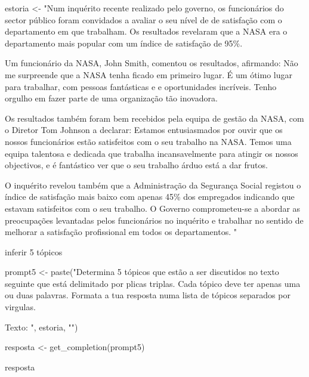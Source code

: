 \documentclass[
  letterpaper,
  paper=6in:9in,
  pagesize=pdftex,
  headinclude=on,
  footinclude=on,
  12pt]{scrbook}
\newenvironment{Shaded}{\begin{snugshade}}{\end{snugshade}}
\newcommand{\FunctionTok}[1]{\textcolor[rgb]{0.28,0.35,0.67}{#1}}
\newcommand{\NormalTok}[1]{\textcolor[rgb]{0.00,0.23,0.31}{#1}}
\newcommand{\OtherTok}[1]{\textcolor[rgb]{0.00,0.23,0.31}{#1}}
\newcommand{\StringTok}[1]{\textcolor[rgb]{0.13,0.47,0.30}{#1}}
\begin{document}
\begin{Shaded}
\begin{Highlighting}[]
\NormalTok{estoria }\OtherTok{\textless{}{-}} \StringTok{"Num inquérito recente realizado pelo governo, }
\StringTok{os funcionários do sector público foram convidados a avaliar o seu nível de }
\StringTok{de satisfação com o departamento em que trabalham. }
\StringTok{Os resultados revelaram que a NASA era o departamento mais popular }
\StringTok{com um índice de satisfação de 95\%.}

\StringTok{Um funcionário da NASA, John Smith, comentou os resultados, }
\StringTok{afirmando: \textquotesingle{}Não me surpreende que a NASA tenha ficado em primeiro lugar. }
\StringTok{É um ótimo lugar para trabalhar, com pessoas fantásticas e }
\StringTok{e oportunidades incríveis. Tenho orgulho em fazer parte de }
\StringTok{uma organização tão inovadora.\textquotesingle{}}

\StringTok{Os resultados também foram bem recebidos pela equipa de gestão da NASA, }
\StringTok{com o Diretor Tom Johnson a declarar: \textquotesingle{}Estamos entusiasmados por }
\StringTok{ouvir que os nossos funcionários estão satisfeitos com o seu trabalho na NASA. }
\StringTok{Temos uma equipa talentosa e dedicada que trabalha incansavelmente }
\StringTok{para atingir os nossos objectivos, e é fantástico ver que o seu }
\StringTok{trabalho árduo está a dar frutos\textquotesingle{}.}

\StringTok{O inquérito revelou também que a }
\StringTok{Administração da Segurança Social registou o índice de satisfação mais baixo }
\StringTok{com apenas 45\% dos empregados indicando que estavam }
\StringTok{satisfeitos com o seu trabalho. O Governo comprometeu{-}se a }
\StringTok{abordar as preocupações levantadas pelos funcionários no inquérito e }
\StringTok{trabalhar no sentido de melhorar a satisfação profissional em todos os departamentos.}
\StringTok{"}
\end{Highlighting}
\end{Shaded}

inferir 5 tópicos

\begin{Shaded}
\begin{Highlighting}[]
\NormalTok{prompt5 }\OtherTok{\textless{}{-}} \FunctionTok{paste}\NormalTok{(}\StringTok{"Determina 5 tópicos que estão a ser discutidos no texto seguinte }
\StringTok{que está delimitado por plicas triplas.}
\StringTok{Cada tópico deve ter apenas uma ou duas palavras.}
\StringTok{Formata a tua resposta numa lista de tópicos separados por virgulas.}

\StringTok{                 Texto: \textquotesingle{}\textquotesingle{}\textquotesingle{} "}\NormalTok{, estoria, }\StringTok{"\textquotesingle{}\textquotesingle{}\textquotesingle{}"}\NormalTok{)}

\NormalTok{resposta }\OtherTok{\textless{}{-}} \FunctionTok{get\_completion}\NormalTok{(prompt5)}

\NormalTok{resposta}
\end{Highlighting}
\end{Shaded}
\end{document}
